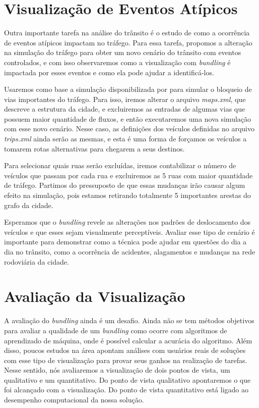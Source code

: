 \section{Visualização de Eventos Atípicos}
\label{sec:vis-eventos}

  Outra importante tarefa na análise do trânsito é o estudo de como a
ocorrência de eventos atípicos impactam no tráfego. Para essa tarefa, propomos
a alteração na simulação do tráfego para obter um novo cenário do trânsito com
eventos controlados, e com isso observaremos como a visualização com \emph{bundling}
é impactada por esses eventos e como ela pode ajudar a identificá-los.

  Usaremos como base a simulação disponibilizada  por \citet{mabs2017} para
simular o bloqueio de vias importantes do tráfego. Para isso, iremos alterar o
arquivo \emph{maps.xml}, que descreve a estrutura da cidade, e excluiremos as
entradas de algumas vias que possuem maior quantidade de fluxos, e então
executaremos uma nova simulação com esse novo cenário. Nesse caso, as
definições dos veículos definidas no arquivo \emph{trips.xml} ainda serão as
mesmas, e esta é uma forma de forçamos os veículos a tomarem rotas alternativas
para chegarem a seus destinos.

 Para selecionar quais ruas serão excluídas, iremos contabilizar o
número de veículos que passam por cada rua e excluiremos as 5 ruas com maior
quantidade de tráfego. Partimos do pressuposto de que essas mudanças irão
causar algum efeito na simulação, pois estamos retirando totalmente 5
importantes arestas do grafo da cidade.

  Esperamos que o \emph{bundling} revele as alterações nos padrões de
deslocamento dos veículos e que esses sejam visualmente perceptíveis. Avaliar
esse tipo de cenário é importante para demonstrar como a técnica pode ajudar em
questões do dia a dia no trânsito, como a ocorrência de acidentes, alagamentos
e mudanças na rede rodoviária da cidade.

\section{Avaliação da Visualização}
  A avaliação do \emph{bundling} ainda é um desafio. Ainda não se tem métodos
objetivos para avaliar a qualidade de um \emph{bundling} como ocorre com
algoritmos de aprendizado de máquina, onde é possível calcular a acurácia do
algoritmo. Além disso, poucos estudos na área apontam análises com usuários
reais de soluções com esse tipo de visualização para provar seus ganhos na
realização de tarefas. Nesse sentido, nós avaliaremos a visualização de dois
pontos de vista, um qualitativo e um quantitativo. Do ponto de vista
qualitativo apontaremos o que foi alcançado com a visualização. Do ponto de
vista quantitativo está ligado ao desempenho computacional da nossa solução.

